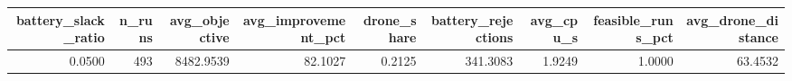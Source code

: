 \begin{tabular}{rrrrrrrrr}
\toprule
battery_slack_ratio & n_runs & avg_objective & avg_improvement_pct & drone_share & battery_rejections & avg_cpu_s & feasible_runs_pct & avg_drone_distance \\
\midrule
0.0500 & 493 & 8482.9539 & 82.1027 & 0.2125 & 341.3083 & 1.9249 & 1.0000 & 63.4532 \\
\bottomrule
\end{tabular}
